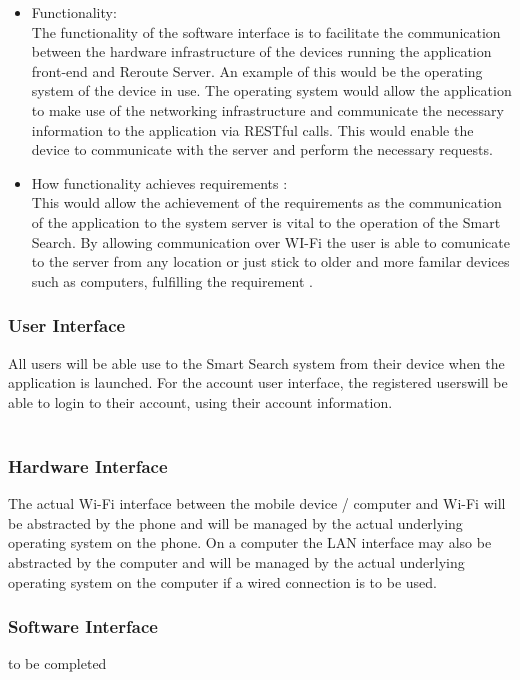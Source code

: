 \documentclass[a4paper,10pt]{article}
\begin{document}
{\begin{enumerate}
					\begin{itemize}
					\item Functionality:\\
						The functionality of the software interface is to facilitate the communication between the hardware infrastructure of the devices running the application front-end and Reroute Server. An example of this would be the operating system of the device in use. The operating system would allow the application to make use of the networking infrastructure and communicate the necessary information to the application via RESTful calls. This would enable the device to communicate with the server and perform the necessary requests.
\\
					\item How functionality achieves requirements :\\
This would allow the achievement of the requirements as the communication of the application to the system server is vital to the operation of the Smart Search. By allowing communication over WI-Fi the user is able to comunicate to the server from any location  or just stick to older and more familar devices such as computers, fulfilling the requirement .
					\end{itemize}
			\end{enumerate} 
}

		
            \subsubsection{User Interface}
	    {All users will be able use to the Smart Search system from their device when the application is launched.
For the account user interface, the registered userswill be able to login to their account, using their account information.
\\\\
}

\subsubsection{Hardware Interface}
		{
The actual Wi-Fi interface between the mobile device / computer and Wi-Fi will be abstracted by the phone and will be managed by the actual underlying operating system on the phone. On a computer the LAN interface may also be abstracted by the computer and will be managed by the actual underlying operating system on the computer if a wired connection is to be used.}
            \subsubsection{Software Interface}
            to be completed
\end{document}
